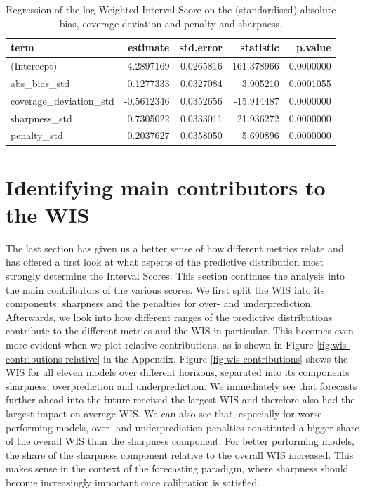 \documentclass[
]{book}
\begin{document}
\begin{table}

\caption{\label{tab:regression-wis-metrics}Regression of the log Weighted Interval Score on the (standardised) absolute bias, coverage deviation and penalty and sharpness.}
\centering
\begin{tabular}[t]{lrrrr}
\toprule
term & estimate & std.error & statistic & p.value\\
\midrule
(Intercept) & 4.2897169 & 0.0265816 & 161.378966 & 0.0000000\\
abs\_bias\_std & 0.1277333 & 0.0327084 & 3.905210 & 0.0001055\\
coverage\_deviation\_std & -0.5612346 & 0.0352656 & -15.914487 & 0.0000000\\
sharpness\_std & 0.7305022 & 0.0333011 & 21.936272 & 0.0000000\\
penalty\_std & 0.2037627 & 0.0358050 & 5.690896 & 0.0000000\\
\bottomrule
\end{tabular}
\end{table}

\hypertarget{contributors}{%
\section{Identifying main contributors to the WIS}\label{contributors}}

The last section has given us a better sense of how different metrics relate and has offered a first look at what aspects of the predictive distribution most strongly determine the Interval Scores. This section continues the analysis into the main contributors of the various scores. We first split the WIS into its components: sharpness and the penalties for over- and underprediction. Afterwards, we look into how different ranges of the predictive distributions contribute to the different metrics and the WIS in particular. This becomes even more evident when we plot relative contributions, as is shown in Figure \ref{fig:wis-contributions-relative} in the Appendix. Figure \ref{fig:wis-contributions} shows the WIS for all eleven models over different horizons, separated into its components sharpness, overprediction and underprediction. We immediately see that forecasts further ahead into the future received the largest WIS and therefore also had the largest impact on average WIS. We can also see that, especially for worse performing models, over- and underprediction penalties constituted a bigger share of the overall WIS than the sharpness component. For better performing models, the share of the sharpness component relative to the overall WIS increased. This makes sense in the context of the forecasting paradigm, where sharpness should become increasingly important once calibration is satisfied.
\end{document}

